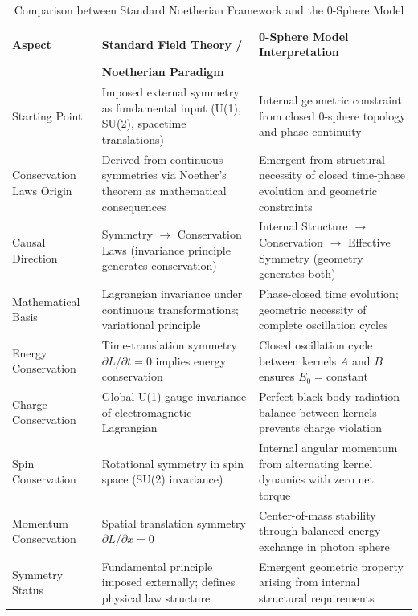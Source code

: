 \documentclass[%
 reprint,
 amsmath,amssymb,
 aps,
]{revtex4-1}
\numberwithin{equation}{section}%
\begin{document}
\begin{table}[t!]
\caption{Comparison between Standard Noetherian Framework and the 0-Sphere Model}
\label{tab:noether_comparison}
\renewcommand{\arraystretch}{1.3}
\begin{tabular}{p{4.8cm}p{6.2cm}p{6.2cm}}
\toprule
\textbf{Aspect} & \textbf{Standard Field Theory /} & \textbf{0-Sphere Model Interpretation} \\
& \textbf{Noetherian Paradigm} & \\
\midrule
Starting Point & Imposed external symmetry as fundamental input (U(1), SU(2), spacetime translations) & Internal geometric constraint from closed 0-sphere topology and phase continuity \\
\addlinespace[0.3cm]
Conservation Laws Origin & Derived from continuous symmetries via Noether's theorem as mathematical consequences & Emergent from structural necessity of closed time-phase evolution and geometric constraints \\
\addlinespace[0.3cm]
Causal Direction & Symmetry $\rightarrow$ Conservation Laws (invariance principle generates conservation) & Internal Structure $\rightarrow$ Conservation $\rightarrow$ Effective Symmetry (geometry generates both) \\
\addlinespace[0.3cm]
Mathematical Basis & Lagrangian invariance under continuous transformations; variational principle & Phase-closed time evolution; geometric necessity of complete oscillation cycles \\
\addlinespace[0.3cm]
Energy Conservation & Time-translation symmetry $\partial L/\partial t = 0$ implies energy conservation & Closed oscillation cycle between kernels $A$ and $B$ ensures $E_0 = \text{constant}$ \\
\addlinespace[0.3cm]
Charge Conservation & Global U(1) gauge invariance of electromagnetic Lagrangian & Perfect black-body radiation balance between kernels prevents charge violation \\
\addlinespace[0.3cm]
Spin Conservation & Rotational symmetry in spin space (SU(2) invariance) & Internal angular momentum from alternating kernel dynamics with zero net torque \\
\addlinespace[0.3cm]
Momentum Conservation & Spatial translation symmetry $\partial L/\partial x = 0$ & Center-of-mass stability through balanced energy exchange in photon sphere \\
\addlinespace[0.3cm]
Symmetry Status & Fundamental principle imposed externally; defines physical law structure & Emergent geometric property arising from internal structural requirements \\

\end{tabular}
\end{table}
\end{document}
